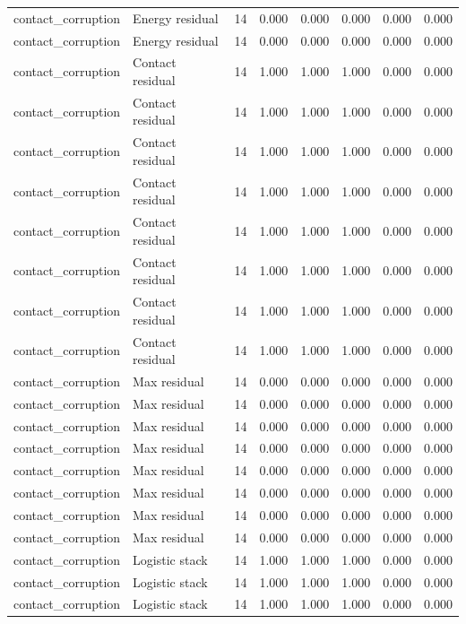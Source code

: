{\begin{longtable}{llrrrrrr}
contact\_corruption & Energy residual & 14 & 0.000 & 0.000 & 0.000 & 0.000 & 0.000 \\
contact\_corruption & Energy residual & 14 & 0.000 & 0.000 & 0.000 & 0.000 & 0.000 \\
contact\_corruption & Contact residual & 14 & 1.000 & 1.000 & 1.000 & 0.000 & 0.000 \\
contact\_corruption & Contact residual & 14 & 1.000 & 1.000 & 1.000 & 0.000 & 0.000 \\
contact\_corruption & Contact residual & 14 & 1.000 & 1.000 & 1.000 & 0.000 & 0.000 \\
contact\_corruption & Contact residual & 14 & 1.000 & 1.000 & 1.000 & 0.000 & 0.000 \\
contact\_corruption & Contact residual & 14 & 1.000 & 1.000 & 1.000 & 0.000 & 0.000 \\
contact\_corruption & Contact residual & 14 & 1.000 & 1.000 & 1.000 & 0.000 & 0.000 \\
contact\_corruption & Contact residual & 14 & 1.000 & 1.000 & 1.000 & 0.000 & 0.000 \\
contact\_corruption & Contact residual & 14 & 1.000 & 1.000 & 1.000 & 0.000 & 0.000 \\
contact\_corruption & Max residual & 14 & 0.000 & 0.000 & 0.000 & 0.000 & 0.000 \\
contact\_corruption & Max residual & 14 & 0.000 & 0.000 & 0.000 & 0.000 & 0.000 \\
contact\_corruption & Max residual & 14 & 0.000 & 0.000 & 0.000 & 0.000 & 0.000 \\
contact\_corruption & Max residual & 14 & 0.000 & 0.000 & 0.000 & 0.000 & 0.000 \\
contact\_corruption & Max residual & 14 & 0.000 & 0.000 & 0.000 & 0.000 & 0.000 \\
contact\_corruption & Max residual & 14 & 0.000 & 0.000 & 0.000 & 0.000 & 0.000 \\
contact\_corruption & Max residual & 14 & 0.000 & 0.000 & 0.000 & 0.000 & 0.000 \\
contact\_corruption & Max residual & 14 & 0.000 & 0.000 & 0.000 & 0.000 & 0.000 \\
contact\_corruption & Logistic stack & 14 & 1.000 & 1.000 & 1.000 & 0.000 & 0.000 \\
contact\_corruption & Logistic stack & 14 & 1.000 & 1.000 & 1.000 & 0.000 & 0.000 \\
contact\_corruption & Logistic stack & 14 & 1.000 & 1.000 & 1.000 & 0.000 & 0.000 \\

\end{longtable}}
